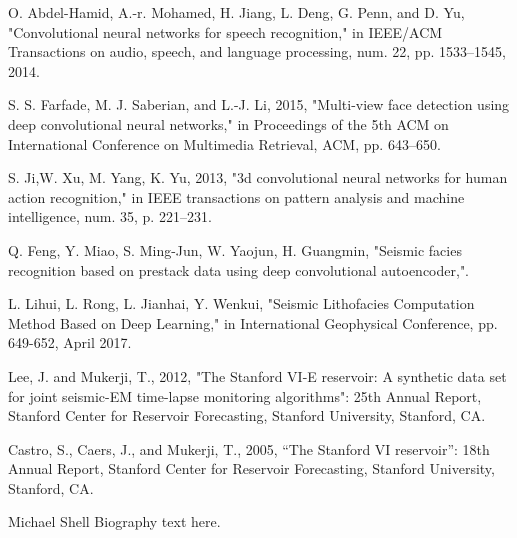 \documentclass[journal]{IEEEtran}
\begin{document}
\begin{thebibliography}{1}
O. Abdel-Hamid, A.-r. Mohamed, H. Jiang, L. Deng, G. Penn, and D. Yu, "Convolutional neural networks for speech recognition," in IEEE/ACM Transactions on audio, speech, and language processing, num. 22, pp. 1533–1545, 2014.

S. S. Farfade, M. J. Saberian, and L.-J. Li, 2015, "Multi-view face detection using deep convolutional neural networks," in Proceedings of the 5th ACM on International Conference on Multimedia Retrieval, ACM, pp. 643–650.

S. Ji,W. Xu, M. Yang, K. Yu, 2013, "3d convolutional neural networks for human action recognition," in IEEE transactions on pattern analysis and machine intelligence, num. 35, p. 221–231.

Q. Feng, Y. Miao, S. Ming-Jun, W. Yaojun, H. Guangmin, "Seismic facies recognition based on prestack data using deep convolutional autoencoder,".

L. Lihui, L. Rong, L. Jianhai, Y. Wenkui, "Seismic Lithofacies Computation Method Based on Deep Learning," in International Geophysical Conference, pp. 649-652, April 2017.

Lee, J. and Mukerji, T., 2012, "The Stanford VI-E reservoir: A synthetic data set for joint seismic-EM time-lapse monitoring algorithms": 25th Annual Report, Stanford Center for Reservoir Forecasting, Stanford University, Stanford, CA.

Castro, S., Caers, J., and Mukerji, T., 2005, “The Stanford VI reservoir”: 18th Annual Report, Stanford Center for Reservoir Forecasting, Stanford University, Stanford, CA.


\end{thebibliography}

% 

\begin{IEEEbiography}{Michael Shell}
Biography text here.
\end{IEEEbiography}
\end{document}
